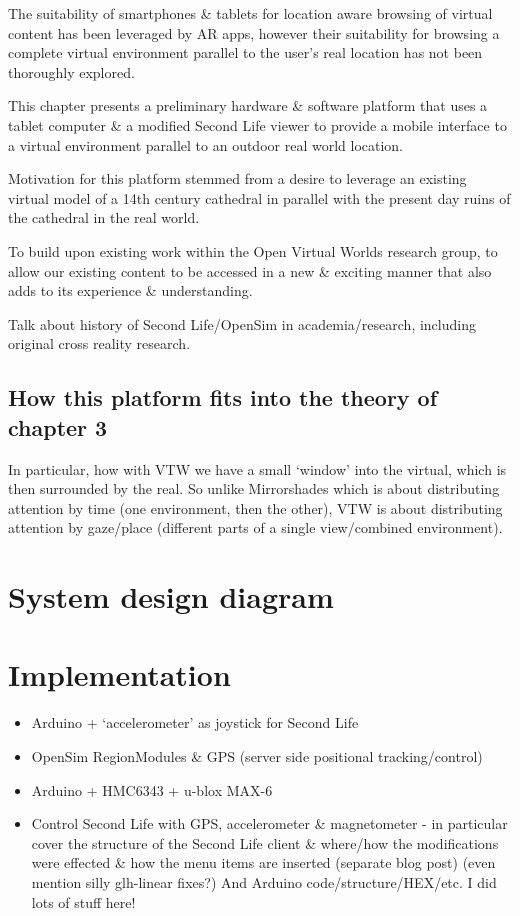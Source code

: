 The suitability of smartphones \& tablets for location aware browsing of virtual content has been leveraged by AR apps, however their suitability for browsing a complete virtual environment parallel to the user's real location has not been thoroughly explored.

This chapter presents a preliminary hardware \& software platform that uses a tablet computer \& a modified Second Life viewer to provide a mobile interface to a virtual environment parallel to an outdoor real world location.

Motivation for this platform stemmed from a desire to leverage an existing virtual model of a 14th century cathedral in parallel with the present day ruins of the cathedral in the real world.

To build upon existing work within the Open Virtual Worlds research group, to allow our existing content to be accessed in a new \& exciting manner that also adds to its experience \& understanding.

Talk about history of Second Life/OpenSim in academia/research, including original cross reality research.

\subsection{How this platform fits into the theory of chapter 3}
In particular, how with VTW we have a small `window' into the virtual, which is then surrounded by the real. So unlike Mirrorshades which is about distributing attention by time (one environment, then the other), VTW is about distributing attention by gaze/place (different parts of a single view/combined environment).

\section{System design diagram}

\section{Implementation}

\begin{itemize}
	\item Arduino + `accelerometer' as joystick for Second Life
	\item OpenSim RegionModules \& GPS (server side positional tracking/control)
	\item Arduino + HMC6343 + u-blox MAX-6
	\item Control Second Life with GPS, accelerometer \& magnetometer - in particular cover the structure of the Second Life client \& where/how the modifications were effected \& how the menu items are inserted (separate blog post) (even mention silly glh-linear fixes?) And Arduino code/structure/HEX/etc. I did lots of stuff here!
\end{itemize}

